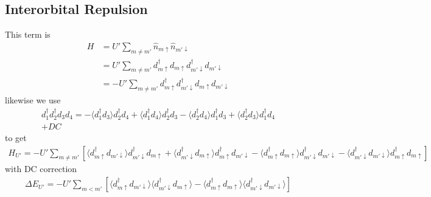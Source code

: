 \documentclass[11pt]{article}
\begin{document}
\subsection{Interorbital Repulsion}
This term is
\begin{align}
    H &= U' \sum_{m \neq m'} \hat n_{m\uparrow}\hat n_{m'\downarrow} \\\nonumber
    &= U' \sum_{m \neq m'} d^\dagger_{m\uparrow}d_{m\uparrow}d^\dagger_{m'\downarrow}d_{m'\downarrow} \\\nonumber
    &= -U' \sum_{m \neq m'} d^\dagger_{m\uparrow}d^\dagger_{m'\downarrow}d_{m\uparrow}d_{m'\downarrow}
\end{align}
likewise we use
\begin{align}
    d^\dagger_1 d^\dagger_2 d_3 d_4 = 
    -\langle d^\dagger_1 d_3 \rangle d^\dagger_2 d_4
    +\langle d^\dagger_1 d_4 \rangle d_2^\dagger d_3
    -\langle d^\dagger_2 d_4 \rangle d^\dagger_1 d_3
    + \langle d^\dagger_2 d_3 \rangle d^\dagger_1 d_4 \\\nonumber
    + DC
\end{align}
to get
\begin{align}
    H_{U'} = -U'\sum_{m\neq m'}\left[
        \langle d^\dagger_{m\uparrow} d_{m'\downarrow} \rangle d^\dagger_{m'\downarrow} d_{m\uparrow}
        + \langle d^\dagger_{m'\downarrow}d_{m\uparrow}\rangle d^\dagger_{m\uparrow}d_{m'\downarrow}
        - \langle d^\dagger_{m\uparrow}d_{m\uparrow}\rangle d^\dagger_{m'\downarrow} d_{m'\downarrow}
        - \langle d^\dagger_{m'\downarrow}d_{m'\downarrow}\rangle d^\dagger_{m\uparrow}d_{m\uparrow}
    \right]
\end{align}
with DC correction
\begin{gather}
    \Delta E_{U'} = -U' \sum_{m < m'}\left[\langle d^\dagger_{m\uparrow} d_{m'\downarrow} \rangle\langle d^\dagger_{m'\downarrow}d_{m\uparrow}\rangle
    - \langle d^\dagger_{m\uparrow}d_{m\uparrow}\rangle \langle d^\dagger_{m'\downarrow}d_{m'\downarrow}\rangle\right]
\end{gather}
\end{document}
